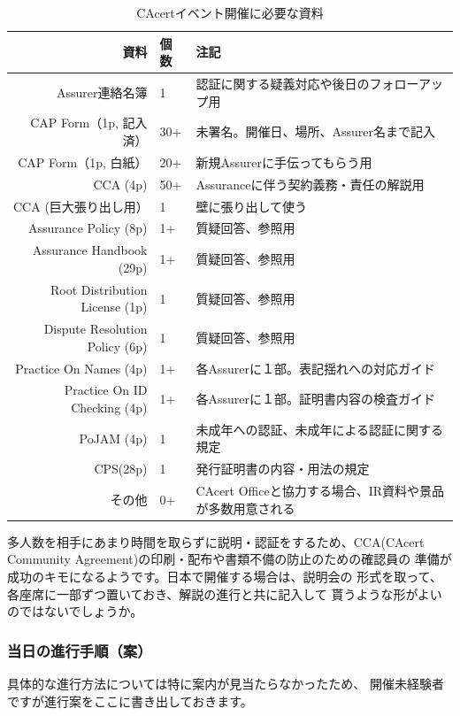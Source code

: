 \documentclass[mingoth,a4paper]{jsarticle}
\begin{document}
\begin{table}[h]
\begin{center}
\begin{tabular}{|r|l|p{25em}|}
\hline
資料 & 個数 & 注記 \\ \hline
Assurer連絡名簿 & 1 & 認証に関する疑義対応や後日のフォローアップ用 \\ \hline
CAP Form（1p, 記入済）& 30+ & 未署名。開催日、場所、Assurer名まで記入 \\ \hline
CAP Form（1p, 白紙）  & 20+ & 新規Assurerに手伝ってもらう用 \\ \hline
CCA (4p)              & 50+ & Assuranceに伴う契約義務・責任の解説用 \\ \hline
CCA (巨大張り出し用） & 1 & 壁に張り出して使う \\ \hline
Assurance Policy (8p)    & 1+ & 質疑回答、参照用 \\ \hline
Assurance Handbook (29p) & 1+ & 質疑回答、参照用 \\ \hline
Root Distribution License (1p) & 1 & 質疑回答、参照用 \\ \hline
Dispute Resolution Policy (6p) & 1 & 質疑回答、参照用 \\ \hline
Practice On Names (4p) & 1+ & 各Assurerに１部。表記揺れへの対応ガイド \\ \hline
Practice On ID Checking (4p) & 1+ & 各Assurerに１部。証明書内容の検査ガイド \\ \hline
PoJAM (4p) & 1 & 未成年への認証、未成年による認証に関する規定 \\ \hline
CPS(28p) & 1 & 発行証明書の内容・用法の規定 \\ \hline
その他 & 0+ & CAcert Officeと協力する場合、IR資料や景品が多数用意される \\ \hline
\end{tabular}
\end{center}
\caption{CAcertイベント開催に必要な資料}
\end{table}

\newpage
多人数を相手にあまり時間を取らずに説明・認証をするため、CCA(CAcert
Community Agreement)の印刷・配布や書類不備の防止のための確認員の
準備が成功のキモになるようです。日本で開催する場合は、説明会の
形式を取って、各座席に一部ずつ置いておき、解説の進行と共に記入して
貰うような形がよいのではないでしょうか。

\subsubsection{当日の進行手順（案）}
具体的な進行方法については特に案内が見当たらなかったため、
開催未経験者ですが進行案をここに書き出しておきます。
\end{document}
